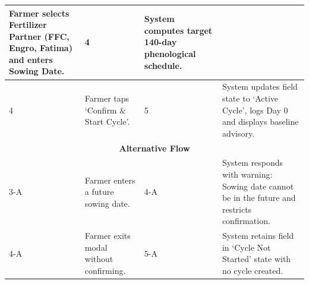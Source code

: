 \documentclass{FastFyp}
\begin{document}
\begin{table}[!ht]
\begin{tabular}{|lllll|}
  \multicolumn{2}{p{6.0cm}|}{Farmer selects Fertilizer Partner (FFC, Engro, Fatima) and enters Sowing Date.} &
  \multicolumn{1}{p{0.8cm}|}{4} &
  \multicolumn{1}{p{5.6cm}|}{System computes target 140-day phenological schedule.} \\ \hline
\multicolumn{1}{|p{0.8cm}|}{4} &
  \multicolumn{2}{p{6.0cm}|}{Farmer taps `Confirm \& Start Cycle'.} &
  \multicolumn{1}{p{0.8cm}|}{5} &
  \multicolumn{1}{p{5.6cm}|}{System updates field state to `Active Cycle', logs Day 0 and displays baseline advisory.} \\ \hline
\multicolumn{5}{|c|}{\textbf{Alternative Flow}} \\ \hline
\multicolumn{1}{|p{0.8cm}|}{3-A} &
  \multicolumn{2}{p{6.0cm}|}{Farmer enters a future sowing date.} &
  \multicolumn{1}{p{0.8cm}|}{4-A} &
  \multicolumn{1}{p{5.6cm}|}{System responds with warning: Sowing date cannot be in the future and restricts confirmation.} \\ \hline
\multicolumn{1}{|p{0.8cm}|}{4-A} &
  \multicolumn{2}{p{6.0cm}|}{Farmer exits modal without confirming.} &
  \multicolumn{1}{p{0.8cm}|}{5-A} &
  \multicolumn{1}{p{5.6cm}|}{System retains field in `Cycle Not Started' state with no cycle created.} \\ \hline
\end{tabular}
\end{table}
\end{document}
